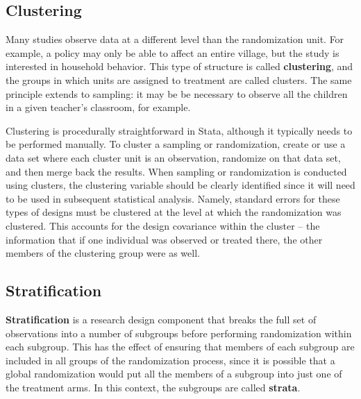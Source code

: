 \subsection{Clustering}

Many studies observe data at a different level than the randomization unit.
For example, a policy may only be able to affect an entire village,
but the study is interested in household behavior.
This type of structure is called \textbf{clustering},
and the groups in which units are assigned to treatment are called clusters.
The same principle extends to sampling:
it may be be necessary to observe all the children
in a given teacher's classroom, for example.

Clustering is procedurally straightforward in Stata,
although it typically needs to be performed manually.
To cluster a sampling or randomization,
create or use a data set where each cluster unit is an observation,
randomize on that data set, and then merge back the results.
When sampling or randomization is conducted using clusters,
the clustering variable should be clearly identified
since it will need to be used in subsequent statistical analysis.
Namely, standard errors for these types of designs must be clustered
at the level at which the randomization was clustered.
This accounts for the design covariance within the cluster --
the information that if one individual was observed or treated there,
the other members of the clustering group were as well.

\subsection{Stratification}

\textbf{Stratification} is a research design component
that breaks the full set of observations into a number of subgroups
before performing randomization within each subgroup.
This has the effect of ensuring that members of each subgroup
are included in all groups of the randomization process,
since it is possible that a global randomization
would put all the members of a subgroup into just one of the treatment arms.
In this context, the subgroups are called \textbf{strata}.


